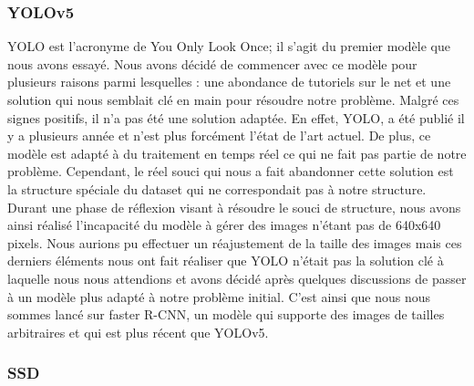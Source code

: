 \subsubsection{YOLOv5}
YOLO est l'acronyme de You Only Look Once; il s'agit du premier modèle que nous avons essayé. Nous avons décidé de commencer avec ce modèle pour plusieurs raisons parmi lesquelles : une abondance de tutoriels sur le net et une solution qui nous semblait clé en main pour résoudre notre problème. Malgré ces signes positifs, il n’a pas été une solution adaptée. \newline
En effet, YOLO, a été publié il y a plusieurs année et n’est plus forcément l’état de l’art actuel. De plus, ce modèle est adapté à du traitement en temps réel ce qui ne fait pas partie de notre problème. Cependant, le réel souci qui nous a fait abandonner cette solution est la structure spéciale du dataset qui ne correspondait pas à notre structure. \newline 
Durant une phase de réflexion visant à résoudre le souci de structure, nous avons ainsi réalisé l’incapacité du modèle à gérer des images n’étant pas de 640x640 pixels. Nous aurions pu effectuer un réajustement de la taille des images mais ces derniers éléments nous ont fait réaliser que YOLO n’était pas la solution clé à laquelle nous nous attendions et avons décidé après quelques discussions de passer à un modèle plus adapté à notre problème initial. C'est ainsi que nous nous sommes lancé sur faster R-CNN, un modèle qui supporte des images de tailles arbitraires et qui est plus récent que YOLOv5.

\subsubsection{SSD}
